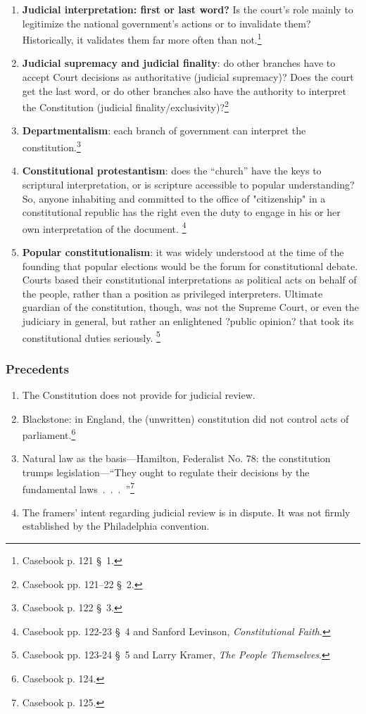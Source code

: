 \begin{enumerate}
\begin{enumerate}
    \item \textbf{Judicial interpretation: first or last word?} Is the court's 
    role mainly to legitimize the national government's actions or to 
    invalidate them? Historically, it validates them far more often than 
    not.\footnote{Casebook p. 121 \S\ 1.}
    \item \textbf{Judicial supremacy and judicial finality}: do other branches 
    have to accept Court decisions as authoritative (judicial supremacy)? Does 
    the court get the last word, or do other branches also have the authority 
    to interpret the Constitution (judicial 
    finality/exclusivity)?\footnote{Casebook pp. 121--22 \S\ 2.}
    \item \textbf{Departmentalism}: each branch of government can interpret 
    the constitution.\footnote{Casebook p. 122 \S\ 3.}
    \item \textbf{Constitutional protestantism}: does the ``church'' have the 
    keys to scriptural interpretation, or is scripture accessible to popular 
    understanding? So, anyone inhabiting and committed to the office of "citizenship" in a constitutional republic has the right even the duty to engage in his or her own interpretation of the document. \footnote{Casebook pp. 122-23 \S\ 4 and Sanford Levinson, 
    \emph{Constitutional Faith}.}
    \item \textbf{Popular constitutionalism}: it was widely understood at the 
    time of the founding that popular elections would be the forum for 
    constitutional debate. Courts based their constitutional interpretations 
    as political acts on behalf of the people, rather than a position as 
    privileged interpreters. Ultimate guardian of the constitution, though, was not the Supreme Court, or even the judiciary in general, but rather an enlightened ?public opinion? that took its constitutional duties seriously. \footnote{Casebook pp. 123-24 \S\ 5 and Larry 
    Kramer, \emph{The People Themselves}.}
\end{enumerate}

\subsubsection{Precedents}

\begin{enumerate}
    \item The Constitution does not provide for judicial review.
    \item Blackstone: in England, the (unwritten) constitution did not control 
    acts of parliament.\footnote{Casebook p. 124.}
    \item Natural law as the basis---Hamilton, Federalist No. 78: the 
    constitution trumps legislation---``They ought to regulate their decisions 
    by the fundamental laws~.~.~.~''\footnote{Casebook p. 125.}
    \item The framers' intent regarding judicial review is in dispute. It was 
    not firmly established by the Philadelphia convention.
\end{enumerate}


\end{enumerate}
